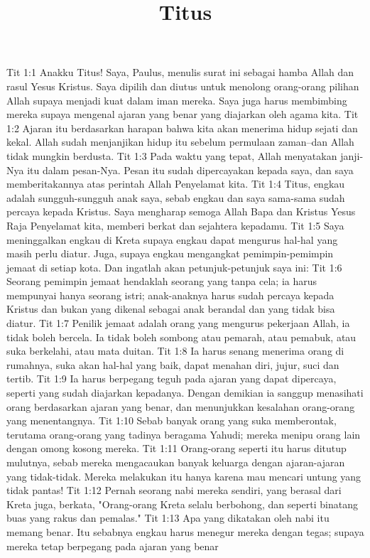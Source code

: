 

\title{Titus}

Tit 1:1  Anakku Titus! Saya, Paulus, menulis surat ini sebagai hamba Allah dan rasul Yesus Kristus. Saya dipilih dan diutus untuk menolong orang-orang pilihan Allah supaya menjadi kuat dalam iman mereka. Saya juga harus membimbing mereka supaya mengenal ajaran yang benar yang diajarkan oleh agama kita.
Tit 1:2  Ajaran itu berdasarkan harapan bahwa kita akan menerima hidup sejati dan kekal. Allah sudah menjanjikan hidup itu sebelum permulaan zaman--dan Allah tidak mungkin berdusta.
Tit 1:3  Pada waktu yang tepat, Allah menyatakan janji-Nya itu dalam pesan-Nya. Pesan itu sudah dipercayakan kepada saya, dan saya memberitakannya atas perintah Allah Penyelamat kita.
Tit 1:4  Titus, engkau adalah sungguh-sungguh anak saya, sebab engkau dan saya sama-sama sudah percaya kepada Kristus. Saya mengharap semoga Allah Bapa dan Kristus Yesus Raja Penyelamat kita, memberi berkat dan sejahtera kepadamu.
Tit 1:5  Saya meninggalkan engkau di Kreta supaya engkau dapat mengurus hal-hal yang masih perlu diatur. Juga, supaya engkau mengangkat pemimpin-pemimpin jemaat di setiap kota. Dan ingatlah akan petunjuk-petunjuk saya ini:
Tit 1:6  Seorang pemimpin jemaat hendaklah seorang yang tanpa cela; ia harus mempunyai hanya seorang istri; anak-anaknya harus sudah percaya kepada Kristus dan bukan yang dikenal sebagai anak berandal dan yang tidak bisa diatur.
Tit 1:7  Penilik jemaat adalah orang yang mengurus pekerjaan Allah, ia tidak boleh bercela. Ia tidak boleh sombong atau pemarah, atau pemabuk, atau suka berkelahi, atau mata duitan.
Tit 1:8  Ia harus senang menerima orang di rumahnya, suka akan hal-hal yang baik, dapat menahan diri, jujur, suci dan tertib.
Tit 1:9  Ia harus berpegang teguh pada ajaran yang dapat dipercaya, seperti yang sudah diajarkan kepadanya. Dengan demikian ia sanggup menasihati orang berdasarkan ajaran yang benar, dan menunjukkan kesalahan orang-orang yang menentangnya.
Tit 1:10  Sebab banyak orang yang suka memberontak, terutama orang-orang yang tadinya beragama Yahudi; mereka menipu orang lain dengan omong kosong mereka.
Tit 1:11  Orang-orang seperti itu harus ditutup mulutnya, sebab mereka mengacaukan banyak keluarga dengan ajaran-ajaran yang tidak-tidak. Mereka melakukan itu hanya karena mau mencari untung yang tidak pantas!
Tit 1:12  Pernah seorang nabi mereka sendiri, yang berasal dari Kreta juga, berkata, "Orang-orang Kreta selalu berbohong, dan seperti binatang buas yang rakus dan pemalas."
Tit 1:13  Apa yang dikatakan oleh nabi itu memang benar. Itu sebabnya engkau harus menegur mereka dengan tegas; supaya mereka tetap berpegang pada ajaran yang benar
